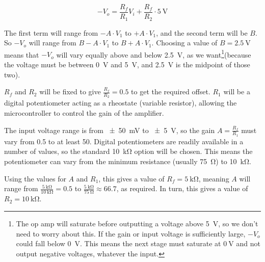 \begin{equation*}
  -V_o = \frac{R_f}{R_1} V_i + \frac{R_f}{R_2} \cdot \SI{5}{\volt}
\end{equation*}

The first term will range from $-A\cdot V_1$ to $+A\cdot V_1$, and the second
term will be $B$. So $-V_o$ will range from $B-A\cdot V_1$ to $B+A\cdot V_1$.
Choosing a value of $B=\SI{2.5}{\volt}$ means that $-V_o$ will vary equally
above and below \SI{2.5}{\volt}, as we want\footnote{The op amp will saturate
before outputting a voltage above \SI{5}{\volt}, so we don't need to worry about
this. If the gain or input voltage is sufficiently large, $-V_o$ could fall
below \SI{0}{\volt}. This means the next stage must saturate at $\SI{0}{\volt}$
and not output negative voltages, whatever the input.  }(because the voltage
must be between \SI{0}{\volt} and \SI{5}{\volt}, and \SI{2.5}{\volt} is the
midpoint of those two).

$R_f$ and $R_2$ will be fixed to give $\frac{R_f}{R_2}=0.5$ to get the required
offset. $R_1$ will be a digital potentiometer acting as a rheostate (variable
resistor), allowing the microcontroller to control the gain of the amplifier.

The input voltage range is from \SI{\pm 50}{\mV} to \SI{\pm 5}{\V}, so the gain
$A=\frac{R_f}{R_1}$ must vary from 0.5 to at least 50.  Digital potentiometers
are readily available in a number of values, so the standard \SI{10}{\kilo\ohm}
option will be chosen. This means the potentiometer can vary from the minimum
resistance (usually \SI{75}{\ohm}) to \SI{10}{\kilo\ohm}.

Using the values for $A$ and $R_1$, this gives a value of
$R_f=\SI{5}{\kilo\ohm}$, meaning $A$ will range from
$\frac{\SI{5}{\kilo\ohm}}{\SI{10}{\kilo\ohm}}=0.5$ to
$\frac{\SI{5}{\kilo\ohm}}{\SI{75}{\ohm}} \approx 66.7$, as required.  In turn,
this gives a value of $R_2 = \SI{10}{\kilo\ohm}$.


